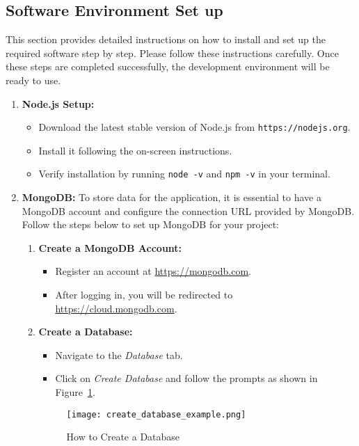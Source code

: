 \subsection{Software Environment Set up}
This section provides detailed instructions on how to install and set up the required software step by step. Please follow these instructions carefully. Once these steps are completed successfully, the development environment will be ready to use.

\begin{enumerate}
    \item \textbf{Node.js Setup:}
    \begin{itemize}
        \item Download the latest stable version of Node.js from \texttt{https://nodejs.org}.
        \item Install it following the on-screen instructions.
        \item Verify installation by running \texttt{node -v} and \texttt{npm -v} in your terminal.
    \end{itemize}
    
    \item \textbf{MongoDB:}
    \newline
    To store data for the application, it is essential to have a MongoDB account and configure the connection URL provided by MongoDB. Follow the steps below to set up MongoDB for your project:
    \begin{enumerate}
    \item \textbf{Create a MongoDB Account:}
    \begin{itemize}
        \item Register an account at \url{https://mongodb.com}.
        \item After logging in, you will be redirected to \url{https://cloud.mongodb.com}.
    \end{itemize}
    
    \item \textbf{Create a Database:}
    \begin{itemize}
        \item Navigate to the \textit{Database} tab.
        \item Click on \textit{Create Database} and follow the prompts as shown in Figure~\ref{fig:create_database}.
    \end{itemize}

    \begin{figure}[H]
	\centering	\texttt{[image: create\_database\_example.png]}
    \caption{How to Create a Database}
    \label{fig:create_database}
    \end{figure}


\end{enumerate}
\end{enumerate}
